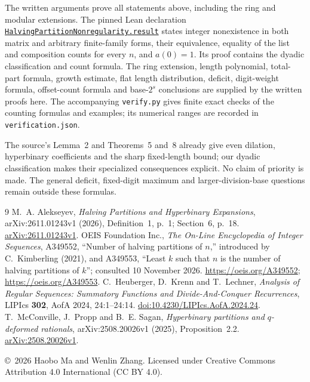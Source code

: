 \documentclass[11pt]{article}
\begin{document}
\medskip
The written arguments prove all statements above, including the ring and
modular extensions. The pinned Lean declaration
\href{https://github.com/the-omega-institute/trureturing/blob/1154841a3345ca579e0d56fc4ceebee38814557c/D5/S1/Recurrence/Partitions/HalvingPartitionNonregularity.lean}
{\texttt{HalvingPartitionNonregularity.result}}
states integer nonexistence in both matrix and arbitrary finite-family
forms, their equivalence, equality of the list and composition counts
for every $n$, and $a(0)=1$. Its proof contains the dyadic classification
and count formula. The ring extension, length polynomial, total-part
formula, growth estimate, flat length distribution, deficit, digit-weight
formula, offset-count formula and base-$2^s$ conclusions are supplied by
the written proofs here.
The accompanying \texttt{verify.py} gives
finite exact checks of the counting formulas and examples; its numerical
ranges are recorded in \texttt{verification.json}.

The source's Lemma~2 and Theorems~5 and~8 already give even dilation,
hyperbinary coefficients and the sharp fixed-length bound; our dyadic
classification makes their specialized consequences explicit. No claim
of priority is made. The general deficit, fixed-digit maximum and
larger-division-base questions remain outside these formulas.

\begin{thebibliography}{9}
M.~A. Alekseyev,
\emph{Halving Partitions and Hyperbinary Expansions},
arXiv:2611.01243v1 (2026), Definition~1, p.~1; Section~6, p.~18.
\href{https://arxiv.org/abs/2611.01243v1}{arXiv:2611.01243v1}.
OEIS Foundation Inc.,
\emph{The On-Line Encyclopedia of Integer Sequences}, A349552,
``Number of halving partitions of $n$,'' introduced by C.~Kimberling
(2021), and A349553, ``Least $k$ such that $n$ is the number of halving
partitions of $k$''; consulted 10 November 2026.
\url{https://oeis.org/A349552}; \url{https://oeis.org/A349553}.
C.~Heuberger, D.~Krenn and T.~Lechner,
\emph{Analysis of Regular Sequences: Summatory Functions and
Divide-And-Conquer Recurrences},
LIPIcs \textbf{302}, AofA 2024, 24:1--24:14.
\href{https://doi.org/10.4230/LIPIcs.AofA.2024.24}
{doi:10.4230/LIPIcs.AofA.2024.24}.
T.~McConville, J.~Propp and B.~E. Sagan,
\emph{Hyperbinary partitions and $q$-deformed rationals},
arXiv:2508.20026v1 (2025), Proposition~2.2.
\href{https://arxiv.org/abs/2508.20026v1}{arXiv:2508.20026v1}.
\end{thebibliography}

\bigskip\noindent
\small\copyright\ 2026 Haobo Ma and Wenlin Zhang.
Licensed under Creative Commons Attribution 4.0 International
(CC BY 4.0).
\end{document}
